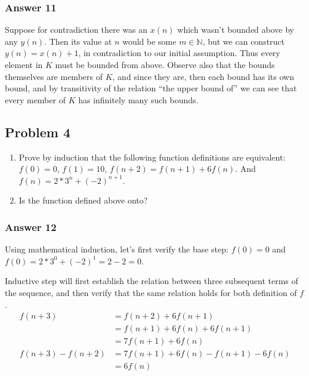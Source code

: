 \documentclass[11pt]{article}
\begin{document}
\subsubsection{Answer 11}
\label{sec-1-3-5}
Suppose for contradiction there was an $x(n)$ which wasn't bounded above by any
$y(n)$.  Then its value at $n$ would be some $m \in \mathbb{N}$, but we can
construct $y(n)=x(n)+1$, in contradiction to our initial assumption.  Thus
every element in $K$ must be bounded from above.  Observe also that the bounds
themselves are members of $K$, and since they are, then each bound has its own
bound, and by transitivity of the relation ``the upper bound of'' we can see
that every member of $K$ has infinitely many such bounds.
\subsection{Problem 4}
\label{sec-1-4}
\begin{enumerate}
\item Prove by induction that the following function definitions are equivalent:
      $f(0)=0$, $f(1)=10$, $f(n+2)=f(n+1)+6f(n)$. And $f(n)=2*3^n+(-2)^{n+1}$.
\item Is the function defined above onto?
\end{enumerate}

\subsubsection{Answer 12}
\label{sec-1-4-1}
Using mathematical induction, let's first verify the base step:
$f(0)=0$ and $f(0)=2*3^0+(-2)^{1}=2-2=0$.

Inductive step will first establish the relation between three subsequent
terms of the sequence, and then verify that the same relation holds for
both definition of $f$.
\begin{equation*}
  \begin{split}
    f(n + 3) &= f(n + 2) + 6f(n + 1) \\
             &= f(n + 1) + 6f(n) + 6f(n + 1) \\
             &= 7f(n + 1) + 6f(n) \\
    f(n + 3) - f(n + 2) &= 7f(n + 1) + 6f(n) - f(n + 1) - 6f(n) \\
                        &= 6f(n)
  \end{split}
\end{equation*}
\end{document}
